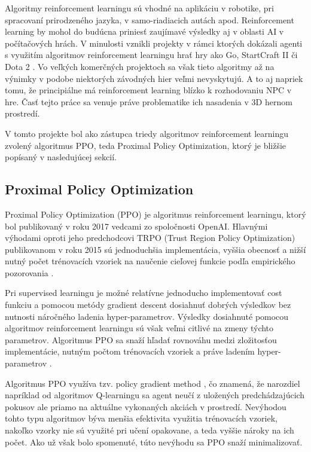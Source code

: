 \documentclass[slovak, master]{diploma}
\begin{document}
Algoritmy reinforcement learningu sú vhodné na aplikáciu v robotike, pri spracovaní prirodzeného jazyka, v samo-riadiacich autách apod. Reinforcement learning by mohol do budúcna priniesť zaujímavé výsledky aj v oblasti AI v počítačových hrách. V minulosti vznikli projekty v rámci ktorých dokázali agenti s využitím algoritmov reinforcement learningu hrať hry ako Go, StartCraft II či Dota 2 \cite{app13042443}. Vo veľkých komerčných projektoch sa však tieto algoritmy až na výnimky v podobe niektorých závodných hier veľmi nevyskytujú. A to aj napriek tomu, že principiálne má reinforcement learning blízko k rozhodovaniu NPC v hre. Časť tejto práce sa venuje práve problematike ich nasadenia v 3D hernom prostredí.

V tomto projekte bol ako zástupca triedy algoritmov reinforcement learningu zvolený algoritmus PPO, teda Proximal Policy Optimization, ktorý je bližšie popísaný v nasledujúcej sekcií.


\subsection{Proximal Policy Optimization}
\label{sec:PPO}
Proximal Policy Optimization (PPO) je algoritmus reinforcement learningu, ktorý bol publikovaný v roku 2017 vedcami zo spoločnosti OpenAI. Hlavnými výhodami oproti jeho predchodcovi TRPO (Trust Region Policy Optimization) publikovanom v roku 2015 sú jednoduchšia implementácia, vyššia obecnosť a nižší nutný počet trénovacích vzoriek na naučenie cieľovej funkcie podľa empirického pozorovania \cite{PPOPaper}.

Pri supervised learningu je možné relatívne jednoducho implementovať cost funkciu a pomocou metódy gradient descent dosiahnuť dobrých výsledkov bez nutnosti náročného ladenia hyper-parametrov. Výsledky dosiahnuté pomocou algoritmov reinforcement learningu sú však veľmi citlivé na zmeny týchto parametrov. Algoritmus PPO sa snaží hľadať rovnováhu medzi zložitosťou implementácie, nutným počtom trénovacích vzoriek a práve ladením hyper-parametrov \cite{PPOPaper}.

Algoritmus PPO využíva tzv. policy gradient method \cite{PPOPaper}, čo znamená, že narozdiel napríklad od algoritmov Q-learningu sa agent neučí z uložených predchádzajúcich pokusov ale priamo na aktuálne vykonaných akciách v prostredí. Nevýhodou tohto typu algoritmov býva menšia efektivita využitia trénovacích vzoriek, nakoľko vzorky nie sú využité pri učení opakovane, a teda vyššie nároky na ich počet. Ako už však bolo spomenuté, túto nevýhodu sa PPO snaží minimalizovať.  
\end{document}
